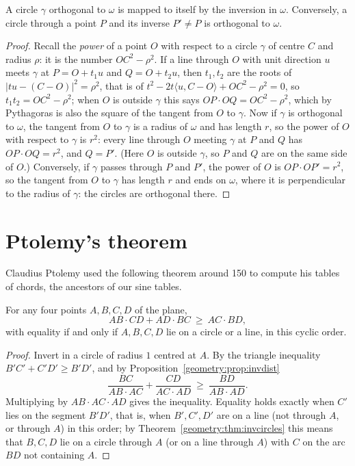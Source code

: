 \begin{proposition}\label{geometry:prop:orthfixed}
A circle $\gamma$ orthogonal to $\omega$ is mapped to itself by the inversion in $\omega$. Conversely, a circle through a point $P$ and its
inverse $P'\ne P$ is orthogonal to $\omega$.
\end{proposition}
\begin{proof}
Recall the \emph{power} of a point $O$ with respect to a circle $\gamma$ of centre $C$ and radius $\rho$: it is the number $OC^2-\rho^2$. If a line
through $O$ with unit direction $u$ meets $\gamma$ at $P=O+t_1u$ and $Q=O+t_2u$, then $t_1,t_2$ are the roots of $|tu-(C-O)|^2=\rho^2$, that is of
$t^2-2t\langle u,C-O\rangle+OC^2-\rho^2=0$, so $t_1t_2=OC^2-\rho^2$; when $O$ is outside $\gamma$ this says $OP\cdot OQ=OC^2-\rho^2$, which by Pythagoras is
also the square of the tangent from $O$ to $\gamma$. Now if $\gamma$ is orthogonal to $\omega$, the tangent from $O$ to $\gamma$ is a radius of $\omega$
and has length $r$, so the power of $O$ with respect to $\gamma$ is $r^2$: every line through $O$ meeting $\gamma$ at $P$ and $Q$ has $OP\cdot OQ=r^2$, and $Q=P'$. (Here $O$ is outside
$\gamma$, so $P$ and $Q$ are on the same side of $O$.) Conversely, if $\gamma$ passes through $P$ and $P'$, the power of $O$ is $OP\cdot OP'=r^2$,
so the tangent from $O$ to $\gamma$ has length $r$ and ends on $\omega$, where it is perpendicular to the radius of $\gamma$: the circles are
orthogonal there.
\end{proof}

\section{Ptolemy's theorem}

Claudius Ptolemy used the following theorem around 150 to compute his tables of chords, the ancestors of our sine tables.

\begin{theorem}\label{geometry:thm:ptolemy}
For any four points $A,B,C,D$ of the plane,
\[
AB\cdot CD+AD\cdot BC\ \ge\ AC\cdot BD,
\]
with equality if and only if $A,B,C,D$ lie on a circle or a line, in this cyclic order.
\end{theorem}
\begin{proof}
Invert in a circle of radius $1$ centred at $A$. By the triangle inequality $B'C'+C'D'\ge B'D'$, and by Proposition~\ref{geometry:prop:invdist}
\[
\frac{BC}{AB\cdot AC}+\frac{CD}{AC\cdot AD}\ \ge\ \frac{BD}{AB\cdot AD}.
\]
Multiplying by $AB\cdot AC\cdot AD$ gives the inequality. Equality holds exactly when $C'$ lies on the segment $B'D'$, that is, when $B',C',D'$
are on a line (not through $A$, or through $A$) in this order; by Theorem~\ref{geometry:thm:invcircles} this means that $B,C,D$ lie on a circle through
$A$ (or on a line through $A$) with $C$ on the arc $BD$ not containing $A$.
\end{proof}

